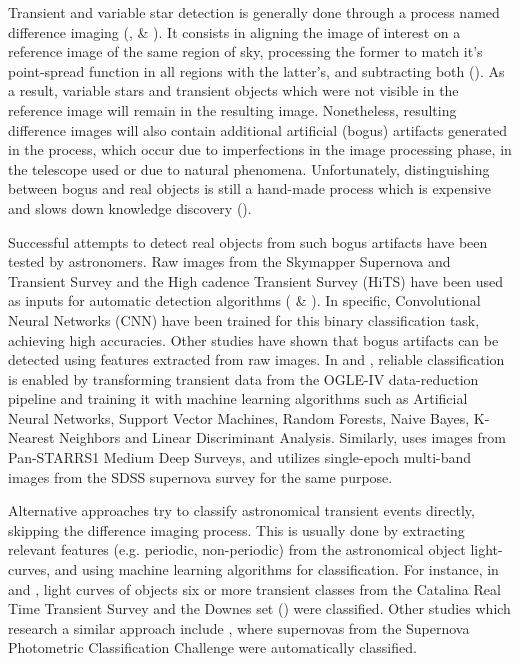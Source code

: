 Transient and variable star detection is generally done through a process named difference imaging (\cite{1507.05137}, \cite{1608.01733} \& \cite{1708.02850}). It consists in aligning the image of interest on a reference image of the same region of sky, processing the former to match it's point-spread function in all regions with the latter's, and subtracting both (\cite{astro-ph/9712287}). As a result, variable stars and transient objects which were not visible in the reference image will remain in the resulting image. Nonetheless, resulting difference images will also contain additional artificial (bogus) artifacts generated in the process, which occur due to imperfections in the image processing phase, in the telescope used or due to natural phenomena. Unfortunately, distinguishing between bogus and real objects is still a hand-made process which is expensive and slows down knowledge discovery (\cite{2011arXiv1110.4655D}).


Successful attempts to detect real objects from such bogus artifacts have been tested by astronomers. Raw images from the  Skymapper Supernova and Transient Survey and the High cadence Transient Survey (HiTS) have been used as inputs for automatic detection algorithms (\cite{1708.08947} \& \cite{1701.00458}). In specific, Convolutional Neural Networks (CNN) have been trained for this binary classification task, achieving high accuracies. Other studies have shown that bogus artifacts can be detected using features extracted from raw images. In \cite{1601.06151} and \cite{1601.06320}, reliable classification is enabled by transforming transient data from the OGLE-IV data-reduction pipeline and training it with machine learning algorithms such as Artificial Neural Networks, Support Vector Machines, Random Forests, Naive Bayes, K-Nearest Neighbors and Linear Discriminant Analysis. Similarly, \cite{1501.05470} uses images from Pan-STARRS1 Medium Deep Surveys, and \cite{1407.4118} utilizes single-epoch multi-band images from the SDSS supernova survey for the same purpose.



Alternative approaches try to classify astronomical transient events directly, skipping the difference imaging process.
This is usually done by extracting relevant features (e.g. periodic, non-periodic) from the astronomical object light-curves, and using machine learning algorithms for classification. For instance, in \cite{1401.3211} and \cite{1601.03931}, light curves of objects six or more transient classes from the Catalina Real Time Transient Survey and the Downes set (\cite{d05}) were classified. Other studies which research a similar approach include \cite{1603.00882}, where supernovas from the Supernova Photometric Classification Challenge were automatically classified.

